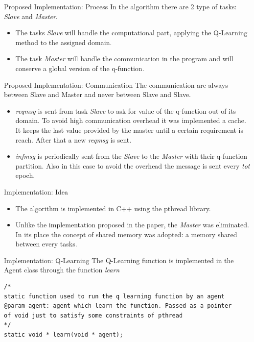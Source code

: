 \documentclass{beamer}
\begin{document}
\begin{frame}{Proposed Implementation: Process}
In the algorithm there are 2 type of tasks: \emph{Slave} and \emph{Master}.
\begin{itemize}
\item The tasks \emph{Slave} will handle the computational part, applying the Q-Learning method to the assigned domain.
\item The task \emph{Master} will handle the communication in the program and will conserve a global version of the q-function.
\end{itemize}
\end{frame}

\begin{frame}{Proposed Implementation: Communication}
The communication are always between Slave and Master and never between Slave and Slave.
\begin{itemize}
\item \emph{reqmsg} is sent from task \emph{Slave} to ask for value of the q-function out of its domain. To avoid high communication overhead it was implemented a cache. It keeps the last value provided by the master until a certain requirement is reach. After that a new \emph{reqmsg} is sent.
\item \emph{infmsg} is periodically sent from the \emph{Slave} to the \emph{Master} with their q-function partition. Also in this case to avoid the overhead the message is sent every \emph{tot} epoch.
\end{itemize}
\end{frame}

\begin{frame}{Implementation: Idea}
\begin{itemize}
\item The algorithm is implemented in C++ using the pthread library.
\item Unlike the implementation proposed in the paper, the \emph{Master} was eliminated. In its place the concept of shared memory was adopted: a memory shared between every tasks.
\end{itemize}
\end{frame}

\begin{frame}[fragile]{Implementation: Q-Learning}
The Q-Learning function is implemented in the Agent class through the function \emph{learn}
\begin{lstlisting}
/*
static function used to run the q learning function by an agent
@param agent: agent which learn the function. Passed as a pointer
of void just to satisfy some constraints of pthread
*/
static void * learn(void * agent);
\end{lstlisting}
\end{frame}
\end{document}
